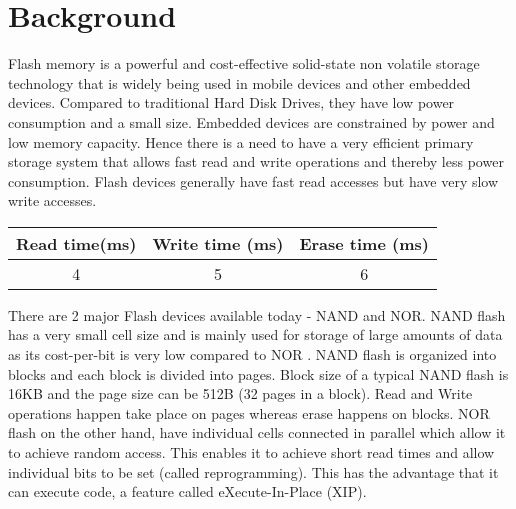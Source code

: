 \section{Background}
	Flash memory is a powerful and cost-effective solid-state non volatile storage technology that is widely being used in mobile devices and other embedded devices. Compared to traditional Hard Disk Drives, they have low power consumption and a small size. Embedded devices are constrained by power and low memory capacity. Hence there is a need to have a very efficient primary storage system that allows fast read and write operations and thereby less power consumption. Flash devices generally have fast read accesses but have very slow write accesses. \\

\begin{center}
   \begin{tabular} {|  c | c | c | }
       \hline
	{\bf Read time(ms)} & {\bf Write time (ms)} & {\bf Erase time (ms)} \\ \hline
	4 & 5 & 6 \\ 
       \hline
   \end{tabular}
\end{center}

There are 2 major Flash devices available today - NAND and NOR. NAND flash has a very small cell size and is mainly used for storage of large amounts of data as its cost-per-bit is very low compared to NOR \cite{Toshiba}. NAND flash is organized into blocks and each block is divided into pages. Block size of a typical NAND flash is 16KB and the page size can be 512B (32 pages in a block). Read and Write operations happen take place on pages whereas erase happens on blocks. NOR flash on the other hand, have individual cells connected in parallel which allow it to achieve random access. This enables it to achieve short read times and allow individual bits to be set (called reprogramming). This has the advantage that it can execute code, a feature called eXecute-In-Place (XIP). \\

